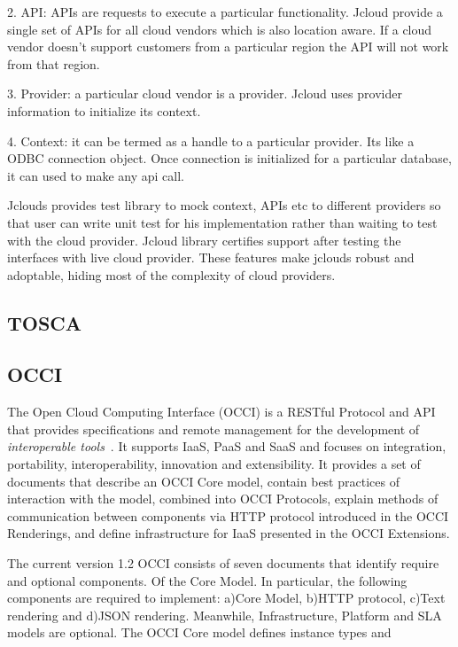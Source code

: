 {     2. API: APIs are requests to execute a particular
        functionality. Jcloud provide a single set of APIs for all
        cloud vendors which is also location aware. If a cloud vendor
        doesn’t support customers from a particular region the API
        will not work from that region.

     3. Provider: a particular cloud vendor is a provider. Jcloud uses
        provider information to initialize its context.

     4. Context: it can be termed as a handle to a particular
        provider. Its like a ODBC connection object. Once connection
        is initialized for a particular database, it can used to make
        any api call.

        Jclouds provides test library to mock context, APIs etc to
        different providers so that user can write unit test for his
        implementation rather than waiting to test with the cloud
        provider. Jcloud library certifies support after testing the
        interfaces with live cloud provider. These features make
        jclouds robust and adoptable, hiding most of the complexity of
        cloud providers.

        \pv

\subsection{TOSCA}


\subsection{OCCI}

The Open Cloud Computing Interface (OCCI) is a RESTful Protocol and
API that provides specifications and remote management for the
development of \textit{interoperable tools}~\cite{www-occi}. It
supports IaaS, PaaS and SaaS and focuses on integration, portability,
interoperability, innovation and extensibility. It provides a set of
documents that describe an OCCI Core model, contain best practices of
interaction with the model, combined into OCCI Protocols, explain
methods of communication between components via HTTP protocol
introduced in the OCCI Renderings, and define infrastructure for IaaS
presented in the OCCI Extensions.

     The current version 1.2 OCCI consists of seven documents that
     identify require and optional components. Of the Core Model.  In
     particular, the following components are required to implement:
     a)Core Model, b)HTTP protocol, c)Text rendering and d)JSON
     rendering. Meanwhile, Infrastructure, Platform and SLA models are
     optional.  The OCCI Core model defines instance types and

}
